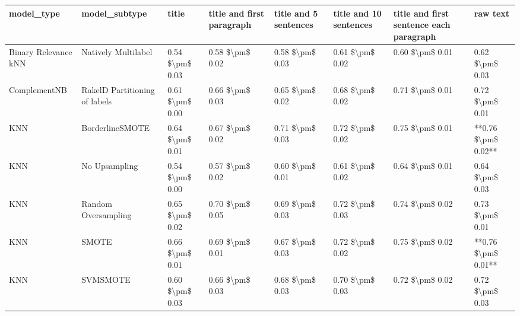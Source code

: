 \begin{tabular}{llllllll}
\toprule
                     model\_type &                 model\_subtype &               title & title and first paragraph & title and 5 sentences & title and 10 sentences & title and first sentence each paragraph &            raw text \\
\midrule
           Binary Relevance kNN &           Natively Multilabel &     0.54 \$\textbackslash pm\$ 0.03 &           0.58 \$\textbackslash pm\$ 0.02 &       0.58 \$\textbackslash pm\$ 0.03 &        0.61 \$\textbackslash pm\$ 0.02 &                         0.60 \$\textbackslash pm\$ 0.01 &     0.62 \$\textbackslash pm\$ 0.03 \\
                   ComplementNB & RakelD Partitioning of labels &     0.61 \$\textbackslash pm\$ 0.00 &           0.66 \$\textbackslash pm\$ 0.03 &       0.65 \$\textbackslash pm\$ 0.02 &        0.68 \$\textbackslash pm\$ 0.02 &                         0.71 \$\textbackslash pm\$ 0.01 &     0.72 \$\textbackslash pm\$ 0.01 \\
                            KNN &               BorderlineSMOTE &     0.64 \$\textbackslash pm\$ 0.01 &           0.67 \$\textbackslash pm\$ 0.02 &       0.71 \$\textbackslash pm\$ 0.03 &        0.72 \$\textbackslash pm\$ 0.02 &                         0.75 \$\textbackslash pm\$ 0.01 & **0.76 \$\textbackslash pm\$ 0.02** \\
                            KNN &                 No Upsampling &     0.54 \$\textbackslash pm\$ 0.00 &           0.57 \$\textbackslash pm\$ 0.02 &       0.60 \$\textbackslash pm\$ 0.01 &        0.61 \$\textbackslash pm\$ 0.02 &                         0.64 \$\textbackslash pm\$ 0.01 &     0.64 \$\textbackslash pm\$ 0.03 \\
                            KNN &           Random Oversampling &     0.65 \$\textbackslash pm\$ 0.02 &           0.70 \$\textbackslash pm\$ 0.05 &       0.69 \$\textbackslash pm\$ 0.03 &        0.72 \$\textbackslash pm\$ 0.03 &                         0.74 \$\textbackslash pm\$ 0.02 &     0.73 \$\textbackslash pm\$ 0.01 \\
                            KNN &                         SMOTE &     0.66 \$\textbackslash pm\$ 0.01 &           0.69 \$\textbackslash pm\$ 0.01 &       0.67 \$\textbackslash pm\$ 0.03 &        0.72 \$\textbackslash pm\$ 0.02 &                         0.75 \$\textbackslash pm\$ 0.02 & **0.76 \$\textbackslash pm\$ 0.01** \\
                            KNN &                      SVMSMOTE &     0.60 \$\textbackslash pm\$ 0.03 &           0.66 \$\textbackslash pm\$ 0.03 &       0.68 \$\textbackslash pm\$ 0.03 &        0.70 \$\textbackslash pm\$ 0.03 &                         0.72 \$\textbackslash pm\$ 0.02 &     0.72 \$\textbackslash pm\$ 0.03 \\

\end{tabular}
